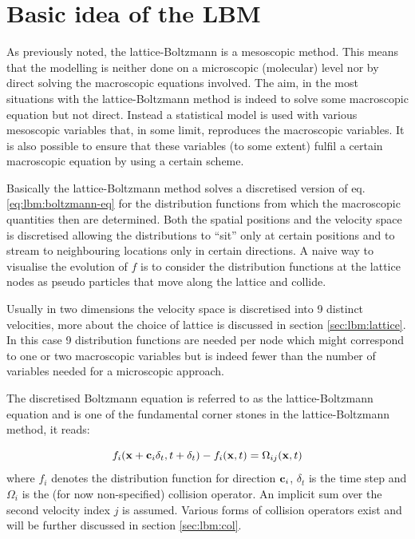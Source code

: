 \section{Basic idea of the LBM}
As previously noted, the lattice-Boltzmann is a mesoscopic
method. This means that the modelling is neither done on a microscopic
(molecular) level nor by direct solving the macroscopic equations
involved. The aim, in the most situations with the lattice-Boltzmann
method is indeed to solve some macroscopic equation but not
direct. Instead a statistical model is used with various mesoscopic
variables that, in some limit, reproduces the macroscopic
variables. It is also possible to ensure that these variables (to some
extent) fulfil a certain macroscopic equation by using a certain
scheme.

Basically the lattice-Boltzmann method solves a discretised version of
eq. \eqref{eq:lbm:boltzmann-eq} for the distribution functions from
which the macroscopic quantities then are determined. Both the spatial
positions and the velocity space is discretised allowing the
distributions to ``sit'' only at certain positions and to stream to
neighbouring locations only in certain directions. A naive way to
visualise the evolution of $f$ is to consider the distribution
functions at the lattice nodes as pseudo particles that move along the
lattice and collide.

Usually in two dimensions the velocity space is discretised into 9
distinct velocities, more about the choice of lattice is discussed in
section \ref{sec:lbm:lattice}. In this case 9 distribution functions
are needed per node which might correspond to one or two macroscopic
variables but is indeed fewer than the number of variables needed for
a microscopic approach.

The discretised Boltzmann equation is referred to as the
lattice-Boltzmann equation and is one of the fundamental corner stones
in the lattice-Boltzmann method, it reads:

\begin{equation}\label{eq:lbm:lbe}
f_i(\mathbf{x} + \mathbf{c}_i\delta_t, t + \delta_t) - f_i(\mathbf{x}, t) = \Omega_{ij}(\mathbf{x}, t)
\end{equation}
where $f_i$ denotes the distribution function for direction $\mathbf{c}_i$,
$\delta_t$ is the time step and $\Omega_i$ is the (for now
non-specified) collision operator. An implicit sum over the second
velocity index $j$ is assumed. Various forms of collision operators
exist and will be further discussed in section \ref{sec:lbm:col}.

